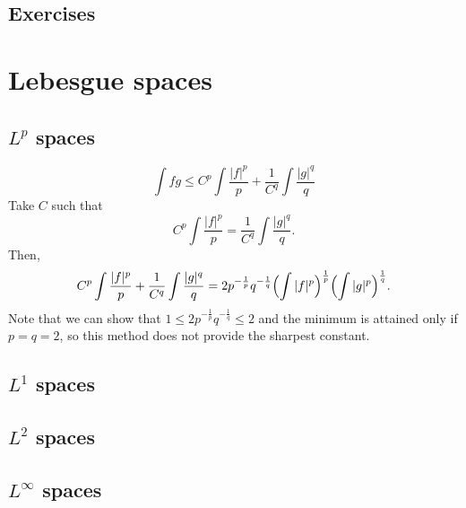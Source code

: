 \documentclass{../../large}
\begin{document}
\section*{Exercises}











\chapter{Lebesgue spaces}
\section{$L^p$ spaces}

\begin{prb}
\end{prb}
\begin{pf}
\[\int fg\le C^p\int\frac{|f|^p}p+\frac1{C^q}\int\frac{|g|^q}q\]
Take $C$ such that
\[C^p\int\frac{|f|^p}p=\frac1{C^q}\int\frac{|g|^q}q.\]
Then,
\[C^p\int\frac{|f|^p}p+\frac1{C^q}\int\frac{|g|^q}q=2p^{-\frac1p}q^{-\frac1q}\Bigl(\int|f|^p\Bigr)^{\frac1p}\Bigl(\int|g|^p\Bigr)^{\frac1q}.\]
Note that we can show that $1\le2p^{-\frac1p}q^{-\frac1q}\le2$ and the minimum is attained only if $p=q=2$, so this method does not provide the sharpest constant.
\end{pf}


\section{$L^1$ spaces}

\begin{prb}[Convolution?]
\end{prb}
\begin{prb}
\end{prb}
\begin{prb}
\end{prb}

\section{$L^2$ spaces}

\section{$L^\infty$ spaces}
\end{document}
